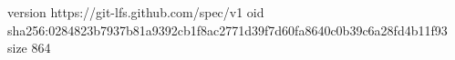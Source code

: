 version https://git-lfs.github.com/spec/v1
oid sha256:0284823b7937b81a9392cb1f8ac2771d39f7d60fa8640c0b39c6a28fd4b11f93
size 864

